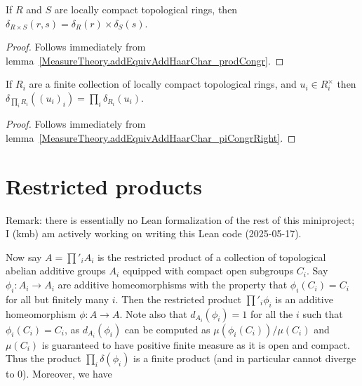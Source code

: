 \begin{lemma}
  \label{MeasureTheory.ringHaarChar_prod}
  \leanok
  If $R$ and $S$ are locally compact topological rings, then $\delta_{R\times S}(r,s)=\delta_R(r)\times\delta_S(s)$.
\end{lemma}
\begin{proof}
  \leanok
  Follows immediately from lemma~\ref{MeasureTheory.addEquivAddHaarChar_prodCongr}.
\end{proof}

\begin{lemma}
  \label{MeasureTheory.ringHaarChar_pi}
  \leanok
  If $R_i$ are a finite collection of locally compact topological rings,
  and $u_i\in R_i^\times$ then $\delta_{\prod_i R_i}((u_i)_i)=\prod_i\delta_{R_i}(u_i)$.
\end{lemma}
\begin{proof}
  \leanok
  Follows immediately from lemma~\ref{MeasureTheory.addEquivAddHaarChar_piCongrRight}.
\end{proof}

\section{Restricted products}

Remark: there is essentially no Lean formalization of the rest of this miniproject;
I (kmb) am actively working on writing this Lean code (2025-05-17).

Now say $A=\prod'_i A_i$ is the restricted product of a collection of topological abelian additive groups $A_i$
  equipped with compact open subgroups $C_i$. Say $\phi_i:A_i\to A_i$ are additive homeomorphisms
  with the property that $\phi_i(C_i)=C_i$ for all but finitely many $i$. Then the restricted
  product $\prod'_i\phi_i$ is an additive homeomorphism $\phi:A\to A$. Note also that
  $d_{A_i}(\phi_i)=1$ for all the $i$ such that $\phi_i(C_i)=C_i$, as $d_{A_i}(\phi_i)$ can be
  computed as $\mu(\phi_i(C_i))/\mu(C_i)$ and $\mu(C_i)$ is guaranteed to have positive finite measure
  as it is open and compact. Thus the product $\prod_i\delta(\phi_i)$ is a finite product (and in
  particular cannot diverge to $0$). Moreover, we have

